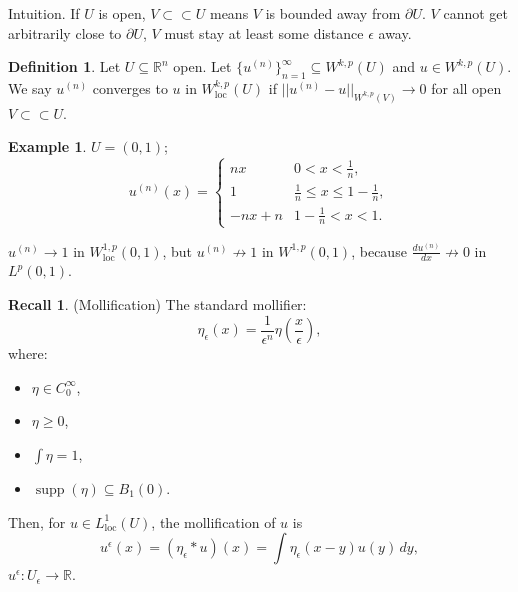 \documentclass[12pt]{article}
\DeclareMathOperator{\supp}{supp}
\theoremstyle{definition}
\newtheorem*{definition*}{Definition}
\newtheorem*{recall}{Recall}
\newtheorem*{example*}{Example}
\begin{document}
Intuition. If $U$ is open, $V\subset\subset U$ means $V$ is bounded away from $\partial U$. $V$ cannot get arbitrarily close to $\partial U$, $V$ must stay at least some distance $\epsilon$ away.

\begin{definition*}
Let $U\subseteq\mathbb{R}^n$ open. Let $\{u^{(n)}\}_{n=1}^{\infty}\subseteq W^{k,p}(U)$ and $u\in W^{k,p}(U)$. We say $u^{(n)}$ converges to $u$ in $W_{\text{loc}}^{k,p}(U)$ if $||u^{(n)}-u||_{W^{k,p}(V)}\rightarrow0$ for all open $V\subset\subset U$.
\end{definition*}

\begin{example*}
$U=(0,1)$;
\[u^{(n)}(x)=\left\{\begin{array}{ll}nx&0<x<\frac{1}{n},\\1&\frac{1}{n}\leq x\leq1-\frac{1}{n},\\-nx+n&1-\frac{1}{n}<x<1.\end{array}\right.\]

\begin{center}
\end{center}

$u^{(n)}\rightarrow1$ in $W_{\text{loc}}^{1,p}(0,1)$, but $u^{(n)}\not\rightarrow1$ in $W^{1,p}(0,1)$, because $\frac{du^{(n)}}{dx}\not\rightarrow0$ in $L^p(0,1)$.
\end{example*}

\begin{recall}
(Mollification) The standard mollifier:
\[\eta_{\epsilon}(x)=\frac{1}{\epsilon^n}\eta\left(\frac{x}{\epsilon}\right),\]
where:
\begin{itemize}
\item $\eta\in C_0^{\infty}$,
\item $\eta\geq0$,
\item $\int\eta=1$,
\item $\supp(\eta)\subseteq B_1(0)$.
\end{itemize}

Then, for $u\in L_{\text{loc}}^1(U)$, the mollification of $u$ is
\[u^{\epsilon}(x)=(\eta_{\epsilon}*u)(x)=\int\eta_{\epsilon}(x-y)u(y)\,dy,\]
$u^{\epsilon}:U_{\epsilon}\rightarrow\mathbb{R}$.
\end{recall}
\end{document}
